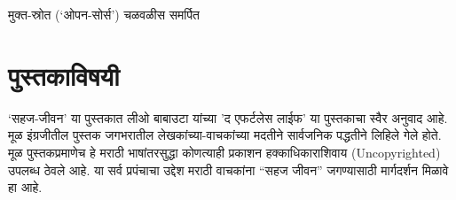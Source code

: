 \begin{dedication}
मुक्त-स्रोत (`ओपन-सोर्स') चळवळीस  समर्पित  
\end{dedication}

\clearpage

\chapter*{पुस्तकाविषयी}
‘सहज-जीवन’ या पुस्तकात लीओ बाबाउटा यांच्या 'द एफर्टलेस लाईफ' या पुस्तकाचा स्वैर अनुवाद आहे.  मूळ इंग्रजीतील पुस्तक जगभरातील लेखकांच्या-वाचकांच्या मदतीने सार्वजनिक पद्धतीने लिहिले गेले होते.  मूळ पुस्तकप्रमाणेच  हे मराठी भाषांतरसुद्धा  कोणत्याही प्रकाशन हक्काधिकाराशिवाय (Uncopyrighted) उपलब्ध ठेवले आहे. या सर्व प्रपंचाचा उद्देश मराठी वाचकांना ``सहज जीवन'' जगण्यासाठी मार्गदर्शन मिळावे हा आहे. 
